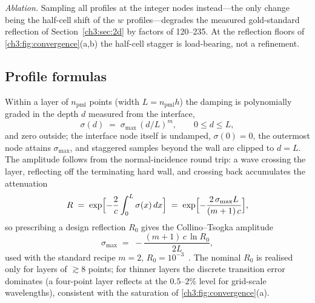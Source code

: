 \emph{Ablation.}  Sampling all profiles at the integer nodes
instead---the only change being the half-cell shift of the $w$
profiles---degrades the measured gold-standard reflection of
Section~\ref{ch3:sec:2d} by factors of 120--235.  At the reflection floors of
\ref{ch3:fig:convergence}(a,b) the half-cell stagger is load-bearing,
not a refinement.

\subsection{Profile formulas}
\label{ch3:appB:profiles}

Within a layer of $n_{\mathrm{pml}}$ points (width
$L=n_{\mathrm{pml}}h$) the damping is polynomially graded in the depth
$d$ measured from the interface,
\begin{equation}
  \sigma(d) \;=\; \sigma_{\max}\,(d/L)^{m},
  \qquad 0\le d\le L,
  \label{ch3:appB:eq:sigma}
\end{equation}
and zero outside; the interface node itself is undamped,
$\sigma(0)=0$, the outermost node attains $\sigma_{\max}$, and
staggered samples beyond the wall are clipped to $d=L$.  The amplitude
follows from the normal-incidence round trip: a wave crossing the
layer, reflecting off the terminating hard wall, and crossing back
accumulates the attenuation
\begin{equation}
  R \;=\; \exp\Bigl[-\frac{2}{c}\int_0^{L}\sigma(x)\,dx\Bigr]
  \;=\; \exp\Bigl[-\frac{2\,\sigma_{\max}L}{(m+1)\,c}\Bigr],
  \label{ch3:appB:eq:roundtrip}
\end{equation}
so prescribing a design reflection $R_0$ gives the Collino--Tsogka
amplitude~\cite{collino2001pml}
\begin{equation}
  \sigma_{\max} \;=\; -\frac{(m+1)\,c\,\ln R_0}{2L},
  \label{ch3:appB:eq:sigmamax}
\end{equation}
used with the standard recipe $m=2$,
$R_0=10^{-3}$~\cite{komatitsch2007unsplit}.  The nominal $R_0$ is
realised only for layers of ${\gtrsim}8$ points; for thinner layers the
discrete transition error dominates (a four-point layer reflects at the
$0.5$--$2\%$ level for grid-scale wavelengths), consistent with the
saturation of \ref{ch3:fig:convergence}(a).

